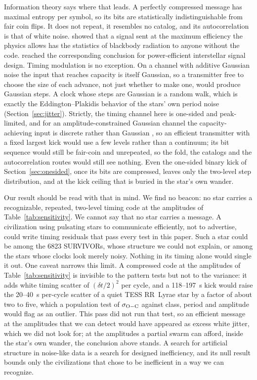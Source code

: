 \documentclass[final,5p]{elsarticle}
\begin{document}
Information theory says where that leads. A perfectly compressed message has maximal entropy per symbol, so its bits are statistically indistinguishable from fair coin flips. It does not repeat, it resembles no catalog, and its autocorrelation is that of white noise. \citet{Lachmann2004} showed that a signal sent at the maximum efficiency the physics allows has the statistics of blackbody radiation to anyone without the code. \citet{Messerschmitt2015} reached the corresponding conclusion for power-efficient interstellar signal design. Timing modulation is no exception. On a channel with additive Gaussian noise the input that reaches capacity is itself Gaussian, so a transmitter free to choose the size of each advance, not just whether to make one, would produce Gaussian steps. A clock whose steps are Gaussian is a random walk, which is exactly the Eddington--Plakidis behavior of the stars' own period noise (Section~\ref{sec:jitter}). Strictly, the timing channel here is one-sided and peak-limited, and for an amplitude-constrained Gaussian channel the capacity-achieving input is discrete rather than Gaussian \citep{Smith1971}, so an efficient transmitter with a fixed largest kick would use a few levels rather than a continuum; its bit sequence would still be fair-coin and unrepeated, so the fold, the catalogs and the autocorrelation routes would still see nothing. Even the one-sided binary kick of Section~\ref{sec:onesided}, once its bits are compressed, leaves only the two-level step distribution, and at the kick ceiling that is buried in the star's own wander.

Our result should be read with that in mind. We find no beacon: no star carries a recognizable, repeated, two-level timing code at the amplitudes of Table~\ref{tab:sensitivity}. We cannot say that no star carries a message. A civilization using pulsating stars to communicate efficiently, not to advertise, could write timing residuals that pass every test in this paper. Such a star could be among the 6823 SURVIVORs, whose structure we could not explain, or among the stars whose clocks look merely noisy. Nothing in its timing alone would single it out. One caveat narrows this limit. A compressed code at the amplitudes of Table~\ref{tab:sensitivity} is invisible to the pattern tests but not to the variance: it adds white timing scatter of $(\delta t/2)^2$ per cycle, and a 118--197~s kick would raise the 20--40~s per-cycle scatter of a quiet TESS RR~Lyrae star by a factor of about two to five, which a population test of $\sigma_{\rm O-C}$ against class, period and amplitude would flag as an outlier. This pass did not run that test, so an efficient message at the amplitudes that we can detect would have appeared as excess white jitter, which we did not look for; at the amplitudes a partial swarm can afford, inside the star's own wander, the conclusion above stands. A search for artificial structure in noise-like data is a search for designed inefficiency, and its null result bounds only the civilizations that chose to be inefficient in a way we can recognize.
\end{document}
